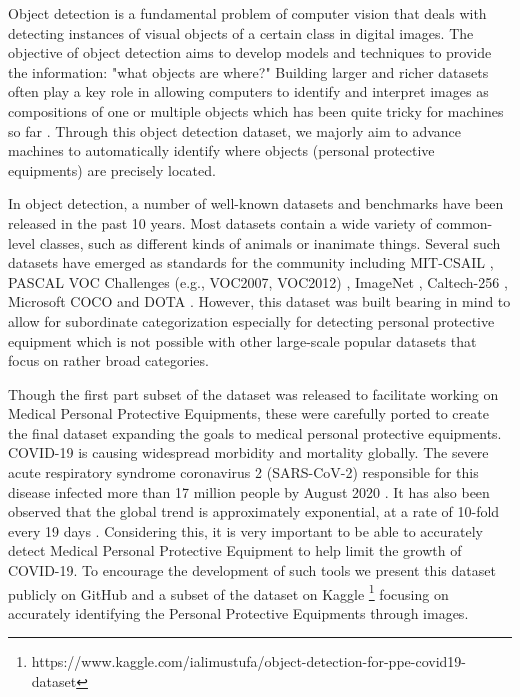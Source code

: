 \documentclass{article}
\begin{document}
Object detection is a fundamental problem of computer vision that deals with detecting instances of visual objects of a certain class in digital images. The objective of object detection aims to develop models and techniques to provide the information: "what objects are where?" \cite{zou2019object} Building larger and richer datasets often play a key role in allowing computers to identify and interpret images as compositions of one or multiple objects which has been quite tricky for machines so far \cite{geirhos2018comparing}. Through this object detection dataset, we majorly aim to advance machines to automatically identify where objects (personal protective equipments) are precisely located.

In object detection, a number of well-known datasets and benchmarks have been released in the past 10 years. Most datasets contain a wide variety of common-level classes, such as different kinds of animals or inanimate things. Several such datasets have emerged as standards for the community including MIT-CSAIL \cite{torralba2004sharing}, PASCAL VOC Challenges (e.g., VOC2007, VOC2012) \cite{everingham2010pascal, everingham2015pascal}, ImageNet \cite{deng2009imagenet}, Caltech-256 \cite{griffin2007caltech}, Microsoft COCO \cite{lin2014microsoft} and DOTA \cite{Xia_2018_CVPR, ding2021object}. However, this dataset was built bearing in mind to allow for subordinate categorization especially for detecting personal protective equipment which is not possible with other large-scale popular datasets that focus on rather broad categories.

Though the first part subset of the dataset was released to facilitate working on Medical Personal Protective Equipments, these were carefully ported to create the final dataset expanding the goals to medical personal protective equipments. COVID-19 is causing widespread morbidity and mortality globally. The severe acute respiratory syndrome coronavirus 2 (SARS-CoV-2) responsible for this disease infected more than 17 million people by August 2020 \cite{merow2020seasonality}. It has also been observed that the global trend is approximately exponential, at a rate of 10-fold every 19 days \cite{li2021covid}. Considering this, it is very important to be able to accurately detect Medical Personal Protective Equipment to help limit the growth of COVID-19. To encourage the development of such tools we present this dataset publicly on GitHub and a subset of the dataset on Kaggle \footnote{https://www.kaggle.com/ialimustufa/object-detection-for-ppe-covid19-dataset} focusing on accurately identifying the Personal Protective Equipments through images.
\end{document}
